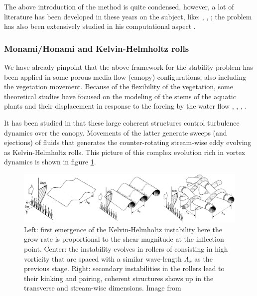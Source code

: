 The above introduction of the method is quite condensed, however, a lot of literature has been developed in these years on the subject, like: \citet{juniper2014modal}, \citet{criminale2003theory}, \citet{schmid2012stability}; the problem has also been extensively studied in his computational aspect \citet{canuto1988spectral}.

\subsubsection{Monami/Honami and Kelvin-Helmholtz rolls}

We have already pinpoint that the above framework for the stability problem has been applied in some porous media flow (canopy) configurations, also including the vegetation movement.
Because of the flexibility of the vegetation, some theoretical studies have focused on the
modeling of the stems of the aquatic plants and their displacement in response to the forcing by the
water flow \citet{py2004mixing}, \citet{patil2010characteristics}, \citet{gosselin2009destabilising}, \citet{py2006frequency}.

It has been studied in \citet{finnigan2000turbulence} that these large coherent structures control turbulence dynamics over the canopy. 
Movements of the latter generate sweeps (and ejections) of fluids that generates the counter-rotating stream-wise eddy evolving as Kelvin-Helmholtz rolls.
This picture of this complex evolution rich in vortex dynamics is shown in figure \ref{fig:monai_evol}.

\begin{figure}[h]
	\centering
	\includegraphics[width=1\linewidth]{chapter_1/finn}
	\caption{Left: first emergence of the Kelvin-Helmholtz instability here the grow rate is proportional to the shear magnitude at the inflection point. Center: the instability evolves in rollers of consisting in high vorticity that are spaced with a similar wave-length $\Lambda_x$ as the previous stage.  Right: secondary instabilities in the rollers lead to their kinking and pairing, coherent structures shows up in the transverse and stream-wise dimensions. Image from \citet{finnigan2000turbulence}}
	\label{fig:monai_evol}
\end{figure}


